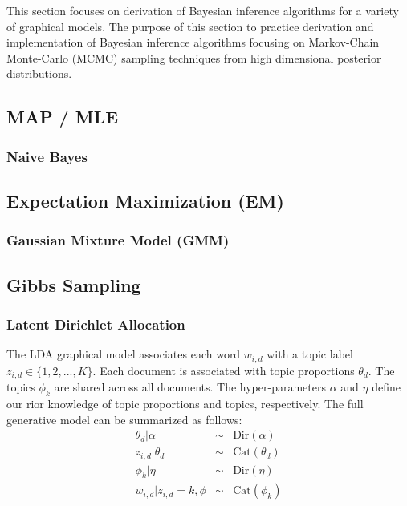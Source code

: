 This section focuses on derivation of Bayesian inference algorithms for a variety of graphical models. The purpose of this section to practice derivation and implementation of Bayesian inference algorithms focusing on Markov-Chain Monte-Carlo (MCMC) sampling techniques from high dimensional posterior distributions. 


\subsection{MAP / MLE}
\subsubsection{Naive Bayes}

\subsection{Expectation Maximization (EM)}
\subsubsection{Gaussian Mixture Model (GMM)}

\subsection{Gibbs Sampling}


\subsubsection{Latent Dirichlet Allocation}

The LDA graphical model associates each word $w_{i,d}$ with a topic label $z_{i,d} \in \{1,2,...,K\}$. Each document is associated with topic proportions $\theta_d$. The topics $\phi_k$ are shared across all documents. The hyper-parameters $\alpha$ and $\eta$ define our rior knowledge of topic proportions and topics, respectively. The full generative model can be summarized as follows:
\begin{eqnarray}
    \theta_d | \alpha &\sim& \mathrm{Dir}(\alpha)\\
    z_{i,d} | \theta_d &\sim& \mathrm{Cat}(\theta_d)\\
    \phi_k | \eta &\sim& \mathrm{Dir}(\eta)\\
    w_{i,d}|z_{i,d}=k,\phi &\sim& \mathrm{Cat}(\phi_k)
\end{eqnarray}

